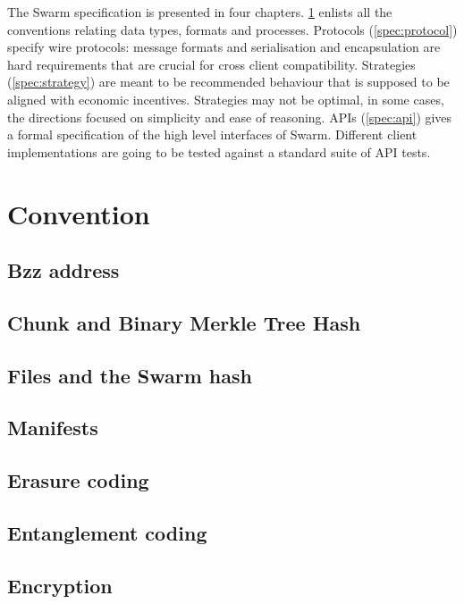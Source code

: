 
The Swarm specification is presented in four chapters. \ref{spec:convention} enlists all the conventions relating data types, formats and processes. Protocols 
(\ref{spec:protocol}) specify wire protocols: message formats and serialisation and encapsulation are hard requirements that are crucial for  cross client compatibility.
Strategies (\ref{spec:strategy}) are meant to be recommended  behaviour that is supposed to be aligned with economic incentives.
Strategies may not be optimal, in some cases, the directions focused on simplicity and ease of reasoning.
APIs (\ref{spec:api}) gives a formal specification of the high level interfaces of Swarm. Different client implementations are going to be tested against a standard suite of API tests.


\chapter{Convention}\label{spec:convention}

\red{}
\section{Bzz address}\label{spec:format:bzzaddress}

\section{Chunk and Binary Merkle Tree Hash}\label{spec:format:bmt}

\section{Files and the Swarm hash}\label{spec:format:files}

\section{Manifests}\label{spec:format:manifests}

\section{Erasure coding}\label{spec:format:erasure}

\section{Entanglement coding}\label{spec:format:entanglements}
%
\section{Encryption}\label{spec:format:encryption}

